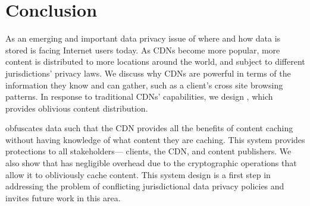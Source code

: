 \section{Conclusion}
\label{sec:conclusion}

As an emerging and important data privacy issue of where and how data is stored is 
facing Internet users today.  As CDNs become more popular, more content is 
distributed to more locations around the world, and subject to different jurisdictions' 
privacy laws.  We discuss why CDNs are powerful in terms of the information they know 
and can gather, such as a client's cross site browsing patterns.  In response to 
traditional CDNs' capabilities, we design \system{}, which provides oblivious content 
distribution. 

\system{} obfuscates data such that the CDN provides all the benefits of content 
caching without having knowledge of what content they are caching.  This system 
provides protections to all stakeholders--- clients, the CDN, and content publishers.  
We also show that \system{} has negligible overhead due to the cryptographic operations 
that allow it to obliviously cache content.  This system design is a first step in 
addressing the problem of conflicting jurisdictional data privacy policies and 
invites future work in this area.
